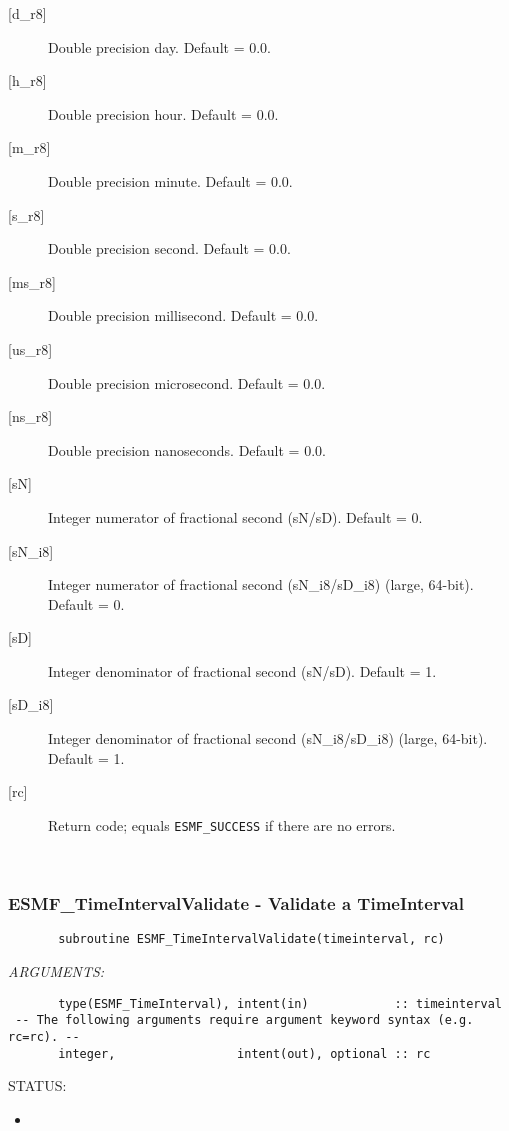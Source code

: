 \begin{description}
       \item[{[d\_r8]}]
            Double precision day.  Default = 0.0.
       \item[{[h\_r8]}]
            Double precision hour.  Default = 0.0.
       \item[{[m\_r8]}]
            Double precision minute.  Default = 0.0.
       \item[{[s\_r8]}]
            Double precision second.  Default = 0.0.
       \item[{[ms\_r8]}]
            Double precision millisecond.  Default = 0.0.
       \item[{[us\_r8]}]
            Double precision microsecond.  Default = 0.0.
       \item[{[ns\_r8]}]
            Double precision nanoseconds.  Default = 0.0.
       \item[{[sN]}]
            Integer numerator of fractional second (sN/sD).
            Default = 0.
       \item[{[sN\_i8]}]
            Integer numerator of fractional second (sN\_i8/sD\_i8)
                                                             (large, 64-bit).
            Default = 0.
       \item[{[sD]}]
            Integer denominator of fractional second (sN/sD).
            Default = 1.
       \item[{[sD\_i8]}]
            Integer denominator of fractional second (sN\_i8/sD\_i8)
                                                             (large, 64-bit).
            Default = 1.
       \item[{[rc]}]
            Return code; equals {\tt ESMF\_SUCCESS} if there are no errors.
       \end{description}
   
 
\mbox{}\hrulefill\ 
 
\subsubsection [ESMF\_TimeIntervalValidate] {ESMF\_TimeIntervalValidate - Validate a TimeInterval}


 
\begin{verbatim}       subroutine ESMF_TimeIntervalValidate(timeinterval, rc)
 \end{verbatim}{\em ARGUMENTS:}
\begin{verbatim}       type(ESMF_TimeInterval), intent(in)            :: timeinterval
 -- The following arguments require argument keyword syntax (e.g. rc=rc). --
       integer,                 intent(out), optional :: rc
 \end{verbatim}
{\sf STATUS:}
   \begin{itemize}
   \item{}
   \end{itemize}
  
